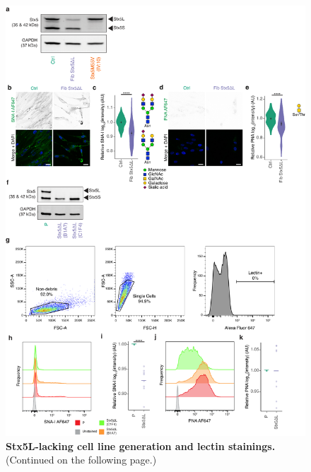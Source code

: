 \begin{figure}[t]
    \includegraphics[keepaspectratio=true,width=\textwidth,height=\textheight]{chapters/chapter6/chapter6_SupplementaryFigure5.pdf}
    \caption{\textbf{Stx5L-lacking cell line generation and lectin stainings.} (Continued on the following page.)}
    \label{fig:ch6supfig5}
\end{figure}

